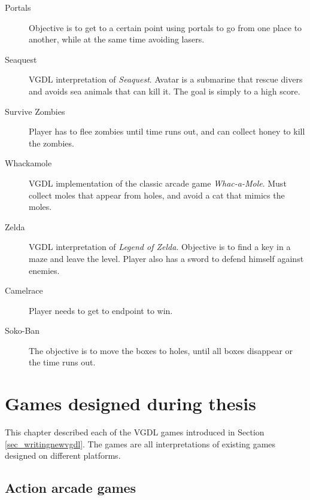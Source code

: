 \documentclass[a4paper,titlepage,final]{report}
\begin{document}
\begin{appendices}
\begin{description}
\item [Portals] Objective is to get to a certain point using portals to go from one place to another, while at the same time avoiding lasers.
\item [Seaquest] VGDL interpretation of \emph{Seaquest}. Avatar is a submarine that rescue divers and avoids sea animals that can kill it. The goal is simply to a high score.
\item [Survive Zombies] Player has to flee zombies until time runs out, and can collect honey to kill the zombies.
\item [Whackamole] VGDL implementation of the classic arcade game \emph{Whac-a-Mole}. Must collect moles that appear from holes, and avoid a cat that mimics the moles.
\item [Zelda] VGDL interpretation of \emph{Legend of Zelda}. Objective is to find a key in a maze and leave the level. Player also has a sword to defend himself against enemies.
\item [Camelrace] Player needs to get to endpoint to win.
\item [Soko-Ban] The objective is to move the boxes to holes, until all boxes disappear or the time runs out.
\end{description}


\chapter{Games designed during thesis}
\label{app_thesisgames}

This chapter described each of the VGDL games introduced in Section \ref{sec_writingnewvgdl}.
The games are all interpretations of existing games designed on different platforms.

\section{Action arcade games}


\end{appendices}
\end{document}
